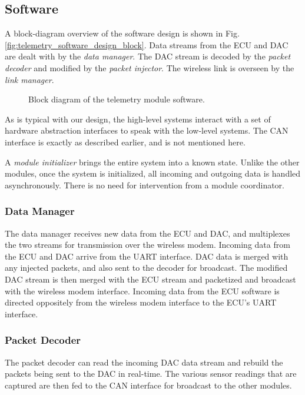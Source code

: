 \subsection{Software}
	
A block-diagram overview of the software design is shown in Fig. \ref{fig:telemetry_software_design_block}. Data streams from the ECU and DAC are dealt with by the \emph{data manager}. The DAC stream is decoded by the \emph{packet decoder} and modified by the \emph{packet injector}. The wireless link is overseen by the \emph{link manager}. 

\begin{figure}[H]
	\centering
	
	\caption{Block diagram of the telemetry module software.}
	\label{fig:telemetry_software_block}
\end{figure}

As is typical with our design, the high-level systems interact with a set of hardware abstraction interfaces to speak with the low-level systems. The CAN interface is exactly as described earlier, and is not mentioned here.

A \emph{module initializer} brings the entire system into a known state. Unlike the other modules, once the system is initialized, all incoming and outgoing data is handled asynchronously. There is no need for intervention from a module coordinator. 

\subsubsection{Data Manager}

The data manager receives new data from the ECU and DAC, and multiplexes the two streams for transmission over the wireless modem. Incoming data from the ECU and DAC arrive from the UART interface. DAC data is merged with any injected packets, and also sent to the decoder for broadcast. The modified DAC stream is then merged with the ECU stream and packetized and broadcast with the wireless modem interface. Incoming data from the ECU software is directed oppositely from the wireless modem interface to the ECU's UART interface.

\subsubsection{Packet Decoder}
\label{sec:design_telemetry_decoder}

The packet decoder can read the incoming DAC data stream and rebuild the packets being sent to the DAC in real-time. The various sensor readings that are captured are then fed to the CAN interface for broadcast to the other modules.


